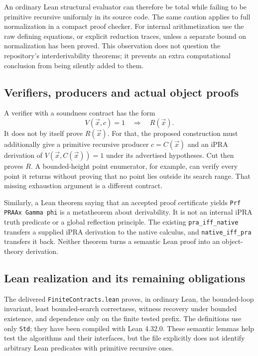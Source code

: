 An ordinary Lean structural evaluator can therefore be total while failing
to be primitive recursive uniformly in its source code.  The same caution
applies to full normalization in a compact proof checker.  For internal
arithmetization use the raw defining equations, or explicit reduction traces,
unless a separate bound on normalization has been proved.  This observation
does not question the repository's interderivability theorems; it prevents
an extra computational conclusion from being silently added to them.

\subsection{Verifiers, producers and actual object proofs}

A verifier with a soundness contract has the form
\[
 V(\vec x,c)=1\quad\Longrightarrow\quad R(\vec x).
\]
It does not by itself prove $R(\vec x)$.  For that, the proposed construction
must additionally give a primitive recursive producer $c=C(\vec x)$ and an
iPRA derivation of $V(\vec x,C(\vec x))=1$ under its advertised hypotheses.
Cut then proves $R$.  A bounded-height point enumerator, for example, can
verify every point it returns without proving that no point lies outside its
search range.  That missing exhaustion argument is a different contract.

Similarly, a Lean theorem saying that an accepted proof certificate yields
\texttt{Prf PRAAx Gamma phi} is a metatheorem about derivability.  It is not an
internal iPRA truth predicate or a global reflection principle.  The existing
\texttt{pra\_iff\_native} transfers a supplied iPRA derivation to the native
calculus, and \texttt{native\_iff\_pra} transfers it back.  Neither theorem
turns a semantic Lean proof into an object-theory derivation.

\subsection{Lean realization and its remaining obligations}

The delivered \texttt{FiniteContracts.lean} proves, in ordinary Lean, the
bounded-loop invariant, least bounded-search correctness, witness recovery
under bounded existence, and dependence only on the finite tested prefix.
The definitions use only \texttt{Std}; they have been compiled with Lean
4.32.0.  These semantic lemmas help test the algorithms and their interfaces,
but the file explicitly does not identify arbitrary Lean predicates with
primitive recursive ones.

